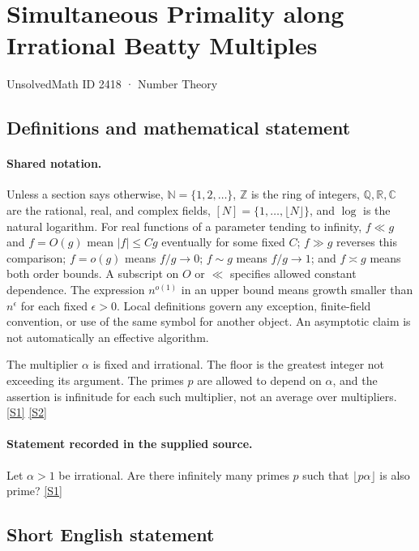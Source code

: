 \documentclass[11pt,a4paper]{article}
\newcommand{\N}{\mathbb{N}}
\newcommand{\Z}{\mathbb{Z}}
\newcommand{\Q}{\mathbb{Q}}
\newcommand{\R}{\mathbb{R}}
\newcommand{\C}{\mathbb{C}}
\newcommand{\sref}[2]{\hyperlink{source:#1:#2}{[S#2]}}
\begin{document}

\setcounter{section}{2417}

\section{Simultaneous Primality along Irrational Beatty Multiples}\label{2418}

{\small\sffamily UnsolvedMath ID 2418 · Number Theory}

\subsection{Definitions and mathematical statement}

\paragraph{Shared notation.}Unless a section says otherwise, $\N=\{1,2,\ldots\}$,
$\Z$ is the ring of integers, $\Q,\R,\C$ are the rational, real, and complex
fields, $[N]=\{1,\ldots,\lfloor N\rfloor\}$, and $\log$ is the natural
logarithm. For real functions of a parameter tending to infinity,
$f\ll g$ and $f=O(g)$ mean $|f|\leq Cg$ eventually for some fixed $C$;
$f\gg g$ reverses this comparison; $f=o(g)$ means $f/g\to0$;
$f\sim g$ means $f/g\to1$; and $f\asymp g$ means both order bounds.
A subscript on $O$ or $\ll$ specifies allowed constant dependence.
The expression $n^{o(1)}$ in an upper bound means growth smaller than
$n^\epsilon$ for each fixed $\epsilon>0$. Local definitions govern any
exception, finite-field convention, or use of the same symbol for another
object. An asymptotic claim is not automatically an effective algorithm.



The multiplier $\alpha$ is fixed and irrational. The floor is the greatest integer not exceeding its argument. The primes $p$ are allowed to depend on $\alpha$, and the assertion is infinitude for each such multiplier, not an average over multipliers. \sref{2418}{1} \sref{2418}{2}

\paragraph{Statement recorded in the supplied source.}
Let $\alpha>1$ be irrational. Are there infinitely many primes $p$ such that $\lfloor p\alpha\rfloor$ is also prime? \sref{2418}{1}

\subsection{Short English statement}
\end{document}
